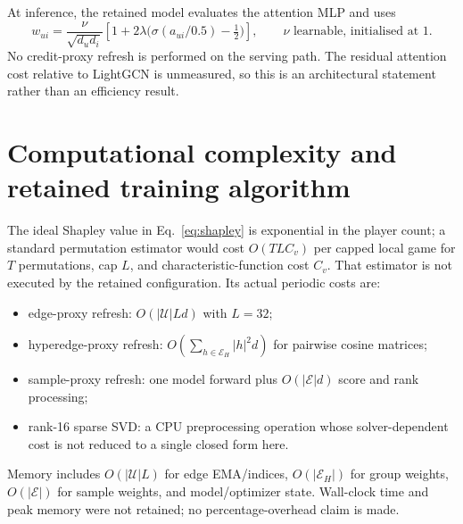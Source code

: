 \documentclass[a4paper,fleqn,longmktitle]{cas-dc}
\begin{document}
At inference, the retained model evaluates the attention MLP and uses
\begin{equation}
w_{ui}=\frac{\nu}{\sqrt{d_ud_i}}
\left[1+2\lambda\bigl(\sigma(a_{ui}/0.5)-\tfrac12\bigr)\right],
\qquad \nu\text{ learnable, initialised at }1.
\label{eq:infweight}
\end{equation}
No credit-proxy refresh is performed on the serving path. The residual
attention cost relative to LightGCN is unmeasured, so this is an architectural
statement rather than an efficiency result.

\section{Computational complexity and retained training algorithm}
\label{sec:complexity}

The ideal Shapley value in Eq.~\eqref{eq:shapley} is exponential in the player
count; a standard permutation estimator would cost
$O(TLC_v)$ per capped local game for $T$ permutations, cap $L$, and
characteristic-function cost $C_v$. That estimator is not executed by the
retained configuration. Its actual periodic costs are:
\begin{itemize}
\item edge-proxy refresh: $O(|\mathcal U|Ld)$ with $L=32$;
\item hyperedge-proxy refresh:
$O(\sum_{h\in\mathcal E_H}|h|^2d)$ for pairwise cosine matrices;
\item sample-proxy refresh: one model forward plus $O(|\mathcal E|d)$ score and
rank processing;
\item rank-16 sparse SVD: a CPU preprocessing operation whose solver-dependent
cost is not reduced to a single closed form here.
\end{itemize}
Memory includes $O(|\mathcal U|L)$ for edge EMA/indices,
$O(|\mathcal E_H|)$ for group weights, $O(|\mathcal E|)$ for sample weights,
and model/optimizer state. Wall-clock time and peak memory were not retained;
no percentage-overhead claim is made.
\end{document}
